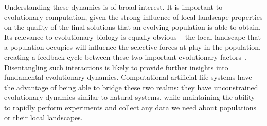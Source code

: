 \documentclass[10pt,letterpaper,final]{article}
\begin{document}
Understanding these dynamics is of broad interest. It is important to evolutionary computation, given the strong influence of local landscape properties on the quality of the final solutions that an evolving population is able to obtain. Its relevance to evolutionary biology is equally obvious -- the local landscape that a population occupies will influence the selective forces at play in the population, creating a feedback cycle between these two important evolutionary factors~\cite{zaman_coevolution_2014,meyer_repeatability_2012,martin_fitness_2006,kvitek_reciprocal_2011}. Disentangling such interactions is likely to provide further insights into fundamental evolutionary dynamics. Computational artificial life systems have the advantage of being able to bridge these two realms: they have unconstrained evolutionary dynamics similar to natural systems, while maintaining the ability to rapidly perform experiments and collect any data we need about populations or their local landscapes.
%
%
%
%
%
%
\end{document}
